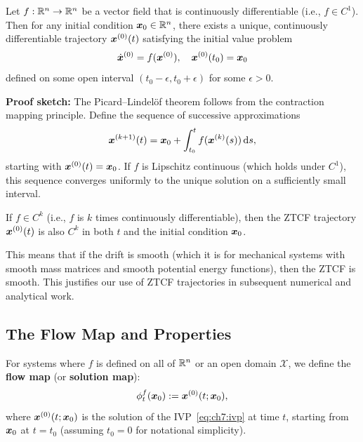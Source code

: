 \begin{theorem}
\label{thm:ch7:picard-lindelof}
Let $f:\mathbb{R}^n\to\mathbb{R}^n$ be a vector field that is continuously differentiable (i.e., $f\in C^1$).
Then for any initial condition $\bm{x}_0\in\mathbb{R}^n$, there exists a unique, continuously
differentiable trajectory $\bm{x}^{(0)}(t)$ satisfying the initial value problem
\begin{equation}
\dot{\bm{x}}^{(0)} = f(\bm{x}^{(0)}), \quad \bm{x}^{(0)}(t_0) = \bm{x}_0
\label{eq:ch7:ivp}
\end{equation}
defined on some open interval $(t_0-\epsilon, t_0+\epsilon)$ for some $\epsilon>0$.
\end{theorem}

\noindent\textbf{Proof sketch:} The Picard--Lindelöf theorem follows from the contraction
mapping principle. Define the sequence of successive approximations
\begin{equation}
\bm{x}^{(k+1)}(t) = \bm{x}_0 + \int_{t_0}^{t} f(\bm{x}^{(k)}(s))\,\mathrm{d}s,
\end{equation}
starting with $\bm{x}^{(0)}(t)=\bm{x}_0$. If $f$ is Lipschitz continuous (which holds under $C^1$),
this sequence converges uniformly to the unique solution on a sufficiently small interval.

\begin{corollary}
\label{cor:ch7:ztcf-smooth}
If $f\in C^k$ (i.e., $f$ is $k$ times continuously differentiable), then the ZTCF trajectory
$\bm{x}^{(0)}(t)$ is also $C^k$ in both $t$ and the initial condition $\bm{x}_0$.
\end{corollary}

This means that if the drift is smooth (which it is for mechanical systems with smooth
mass matrices and smooth potential energy functions), then the ZTCF is smooth. This
justifies our use of ZTCF trajectories in subsequent numerical and analytical work.

\subsection{The Flow Map and Properties}

For systems where $f$ is defined on all of $\mathbb{R}^n$ or an open domain $\mathcal{X}$, we define
the \textbf{flow map} (or \textbf{solution map}):
\begin{equation}
\phi_t^f(\bm{x}_0) := \bm{x}^{(0)}(t;\bm{x}_0),
\label{eq:ch7:flow-map}
\end{equation}
where $\bm{x}^{(0)}(t;\bm{x}_0)$ is the solution of the IVP~\eqref{eq:ch7:ivp} at time $t$,
starting from $\bm{x}_0$ at $t=t_0$ (assuming $t_0=0$ for notational simplicity).

